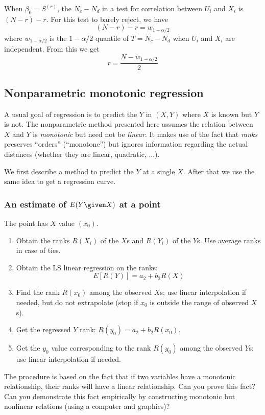\documentclass[12pt]{article}
\begin{document}
When $\beta_0 = S^{(r)}$,
the $N_c - N_d$ in a test for correlation between $U_i$ and $X_i$
is $(N - r) - r$.
For this test to barely reject, we have
\[
(N - r) - r = w_{1 - \alpha/2}
\]
where $w_{1 - \alpha/2}$ is the $1-\alpha/2$ quantile of $T = N_c - N_d$
when $U_i$ and $X_i$ are independent.
From this we get
\[
r = \frac{N - w_{1 - \alpha/2}}{2}
\]

\subsection{Nonparametric monotonic regression}

A usual goal of regression is to predict the $Y$ in $(X, Y)$ where $X$
is known but $Y$ is not.
The nonparametric method presented here assumes the relation between $X$
and $Y$ is \emph{monotonic} but need not be \emph{linear}.
It makes use of the fact that \emph{ranks} preserves ``orders''
(``monotone'') but ignores information regarding the actual distances
(whether they are linear, quadratic, ...).

We first describe a method to predict the $Y$ at a single $X$.
After that we use the same idea to get a regression curve.

\subsubsection{An estimate of $E(Y\given X)$ at a point}

The point has $X$ value $(x_0)$.

\begin{enumerate}
\item Obtain the ranks $R(X_i)$ of the $X$s and $R(Y_i)$ of the $Y$s.
    Use average ranks in case of ties.
\item Obtain the LS linear regression on the ranks:
    \[
        E[R(Y)] = a_2 + b_2 R(X)
    \]
\item Find the rank $R(x_0)$ among the observed $X$s; use linear
    interpolation if needed, but do not extrapolate
    (stop if $x_0$ is outside the range of observed $X$s).
\item Get the regressed $Y$ rank:
    $R(y_0) = a_2 + b_2 R(x_0)$.
\item Get the $y_0$ value corresponding to the rank $R(y_0)$ among the
    observed $Y$s; use linear interpolation if needed.
\end{enumerate}

\exercise The procedure is based on the fact that if two variables have a
monotonic relationship, their ranks will have a linear relationship.
Can you prove this fact? Can you demonstrate this fact empirically
by constructing monotonic but nonlinear relations (using a computer and
graphics)?
\end{document}
